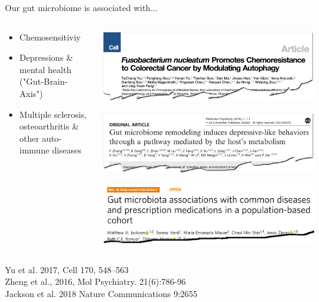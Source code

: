 \documentclass[10pt]{beamer}
\newcommand{\credit}[1]{{\vspace{\fill} \par \raggedleft \scriptsize \mdseries \color{mDarkBrown} #1 \par}}
\begin{document}
\begin{frame}{Our gut microbiome is associated with...}
	\begin{columns}
		\begin{column}{0.4\textwidth}
			\begin{itemize}
				\item Chemosensitiviy
				\item Depressions \& mental health ("Gut-Brain-Axis")
				\item Multiple sclerosis, osteoarthritis  \& other auto-immune diseases
			\end{itemize}
		\end{column}
		\begin{column}{0.7\textwidth}
			\begin{center}
				\includegraphics[width=\textwidth]{./figures/microbiome-chemoresistance.png}\par
				\includegraphics[width=\textwidth]{./figures/gutbrainaxis-2-zhang.png}\par
				\includegraphics[width=\textwidth]{./figures/paper-jackson.png}
			\end{center}
		\end{column}
	\end{columns}
	\credit{
		Yu et al. 2017, Cell 170, 548–563 \\
		Zheng et al., 2016, Mol Psychiatry. 21(6):786-96 \\
		Jackson et al. 2018 Nature Communications 9:2655}
\end{frame}
\end{document}
